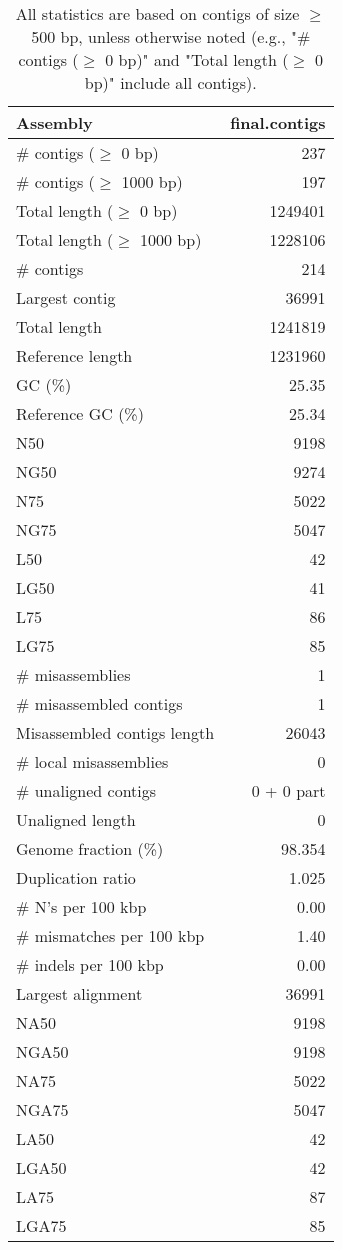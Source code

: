 \documentclass[12pt,a4paper]{article}
\begin{document}
\begin{table}[ht]
\begin{center}
\caption{All statistics are based on contigs of size $\geq$ 500 bp, unless otherwise noted (e.g., "\# contigs ($\geq$ 0 bp)" and "Total length ($\geq$ 0 bp)" include all contigs).}
\begin{tabular}{|l*{1}{|r}|}
\hline
Assembly & final.contigs \\ \hline
\# contigs ($\geq$ 0 bp) & 237 \\ \hline
\# contigs ($\geq$ 1000 bp) & 197 \\ \hline
Total length ($\geq$ 0 bp) & 1249401 \\ \hline
Total length ($\geq$ 1000 bp) & 1228106 \\ \hline
\# contigs & 214 \\ \hline
Largest contig & 36991 \\ \hline
Total length & 1241819 \\ \hline
Reference length & 1231960 \\ \hline
GC (\%) & 25.35 \\ \hline
Reference GC (\%) & 25.34 \\ \hline
N50 & 9198 \\ \hline
NG50 & 9274 \\ \hline
N75 & 5022 \\ \hline
NG75 & 5047 \\ \hline
L50 & 42 \\ \hline
LG50 & 41 \\ \hline
L75 & 86 \\ \hline
LG75 & 85 \\ \hline
\# misassemblies & 1 \\ \hline
\# misassembled contigs & 1 \\ \hline
Misassembled contigs length & 26043 \\ \hline
\# local misassemblies & 0 \\ \hline
\# unaligned contigs & 0 + 0 part \\ \hline
Unaligned length & 0 \\ \hline
Genome fraction (\%) & 98.354 \\ \hline
Duplication ratio & 1.025 \\ \hline
\# N's per 100 kbp & 0.00 \\ \hline
\# mismatches per 100 kbp & 1.40 \\ \hline
\# indels per 100 kbp & 0.00 \\ \hline
Largest alignment & 36991 \\ \hline
NA50 & 9198 \\ \hline
NGA50 & 9198 \\ \hline
NA75 & 5022 \\ \hline
NGA75 & 5047 \\ \hline
LA50 & 42 \\ \hline
LGA50 & 42 \\ \hline
LA75 & 87 \\ \hline
LGA75 & 85 \\ \hline
\end{tabular}
\end{center}
\end{table}
\end{document}
